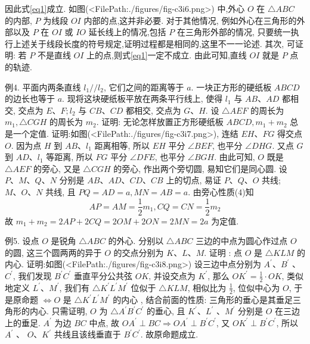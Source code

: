 因此式\ref{eq1}成立.
如图(<FilePath:./figures/fig-c3i6.png>) 中,外心 $O$ 在 $\triangle A B C$ 的内部, $P$ 为线段 $O I$ 内部的点,这并非必要.
对于其他情况, 例如外心在三角形的外部以及 $P$ 在 $O I$ 或 $I O$ 延长线上的情况,包括 $P$ 在三角形外部的情况, 只要统一执行上述关于线段长度的符号规定,证明过程都是相同的,这里不一一论述.
其次, 可证明: 若 $P$ 不是直线 $O I$ 上的点,则式\ref{eq1}一定不成立.
由此可知,直线 $O I$ 就是 $P$ 点的轨迹.



例4. 平面内两条直线 $l_1 / / l_2$, 它们之间的距离等于 $a$. 一块正方形的硬纸板 $A B C D$ 的边长也等于 $a$. 现将这块硬纸板平放在两条平行线上, 使得 $l_1$ 与 $A B 、 A D$ 都相交, 交点为 $E 、 F ; l_2$ 与 $C B 、 C D$ 都相交, 交点为 $G 、 H$. 设 $\triangle A E F$ 的周长为 $m_1, \triangle C G H$ 的周长为 $m_2$. 证明: 无论怎样放置正方形硬纸板 $A B C D, m_1+m_2$ 总是一个定值.
证明:如图(<FilePath:./figures/fig-c3i7.png>), 连结 $E H 、 F G$ 得交点 $O$.
因为点 $H$ 到 $A B 、 l_1$ 距离相等, 所以 $E H$ 平分 $\angle B E F$, 也平分 $\angle D H G$.
又点 $G$ 到 $A D 、 l_1$ 等距离, 所以 $F G$ 平分 $\angle D F E$, 也平分 $\angle B G H$.
由此可知, $O$ 既是 $\triangle A E F$ 的旁心, 又是 $\triangle C G H$ 的旁心, 作出两个旁切圆, 易知它们是同心圆.
设 $P 、 M 、 Q 、 N$ 分别是 $A B 、 A D 、 C D 、 C B$ 上的切点, 易证 $P 、 Q 、 O$ 共线; $M 、 O 、 N$ 共线, 且 $P Q= A D=a, M N=A B=a$.
由旁心性质(4)知
$$
A P=A M=\frac{1}{2} m_1, C Q=C N=\frac{1}{2} m_2
$$
故 $m_1+m_2=2 A P+2 C Q=2 O M+2 O N=2 M N=2 a$ 为定值.



例5. 设点 $O$ 是锐角 $\triangle A B C$ 的外心.
分别以 $\triangle A B C$ 三边的中点为圆心作过点 $O$ 的圆, 这三个圆两两的异于 $O$ 的交点分别为 $K 、 L 、 M$. 证明 : 点 $O$ 是 $\triangle K L M$ 的内心.
证明:如图(<FilePath:./figures/fig-c3i8.png>) 设三边中点分别为 $A^{\prime} 、 B^{\prime}$ 、 $C^{\prime}$, 我们发现 $B^{\prime} C^{\prime}$ 垂直平分公共弦 $O K$, 并设交点为 $K^{\prime}$, 那么 $O K^{\prime}=\frac{1}{2} \cdot O K$, 类似地定义 $L^{\prime} 、 M^{\prime}$, 我们有 $\triangle K^{\prime} L^{\prime} M^{\prime}$ 位似于 $\triangle K L M$, 相似比为 $\frac{1}{2}$, 位似中心为 $O$, 于是原命题 $\Leftrightarrow O$ 是 $\triangle K^{\prime} L^{\prime} M^{\prime}$ 的内心 , 结合前面的性质: 三角形的垂心是其垂足三角形的内心.
只需证明, $O$ 为 $\triangle A^{\prime} B^{\prime} C^{\prime}$ 的垂心, 且 $K^{\prime} 、 L^{\prime}$ 、$M^{\prime}$ 分别是 $O$ 在三边上的垂足.
$A^{\prime}$ 为边 $B C$ 中点, 故 $O A^{\prime} \perp B C \Rightarrow O A^{\prime} \perp B^{\prime} C^{\prime}$, 又 $O K^{\prime} \perp B^{\prime} C^{\prime}$, 所以 $A^{\prime}$ 、 $O 、 K^{\prime}$ 共线且该线垂直于 $B^{\prime} C^{\prime}$.
故原命题成立.



